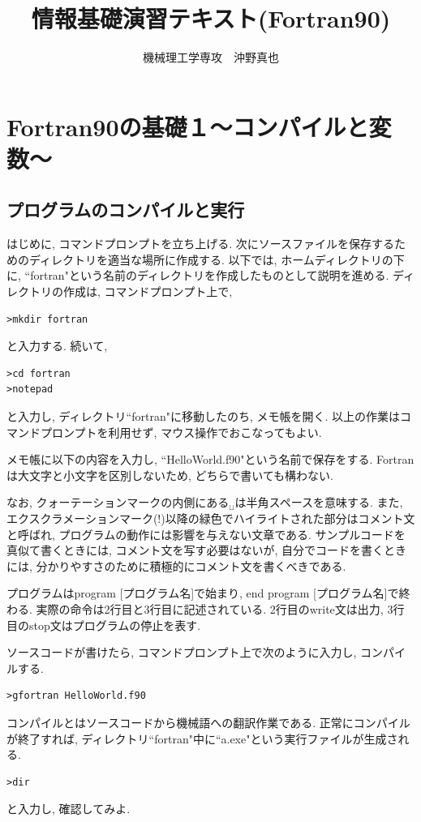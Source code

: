 \documentclass[a4j]{jsbook}
\begin{document}
\title{情報基礎演習テキスト(Fortran90)}
\author{機械理工学専攻　沖野真也}
\date{}
\maketitle

\chapter{Fortran90の基礎１〜コンパイルと変数〜}

\section{プログラムのコンパイルと実行}
はじめに, コマンドプロンプトを立ち上げる.
次にソースファイルを保存するためのディレクトリを適当な場所に作成する.
以下では, ホームディレクトリの下に, ``fortran"という名前のディレクトリを作成したものとして説明を進める.
ディレクトリの作成は, コマンドプロンプト上で,
\begin{Verbatim}[frame=single]
>mkdir fortran
\end{Verbatim}
と入力する. 続いて,
\begin{Verbatim}[frame=single]
>cd fortran
>notepad
\end{Verbatim}
と入力し, ディレクトリ``fortran"に移動したのち, メモ帳を開く.
以上の作業はコマンドプロンプトを利用せず, マウス操作でおこなってもよい.

メモ帳に以下の内容を入力し, ``HelloWorld.f90"という名前で保存をする.
Fortranは大文字と小文字を区別しないため, どちらで書いても構わない.

なお, クォーテーションマークの内側にある$_{\sqcup}$は半角スペースを意味する.
また, エクスクラメーションマーク(!)以降の緑色でハイライトされた部分はコメント文と呼ばれ,
プログラムの動作には影響を与えない文章である.
サンプルコードを真似て書くときには, コメント文を写す必要はないが,
自分でコードを書くときには, 分かりやすさのために積極的にコメント文を書くべきである.

プログラムはprogram [プログラム名]で始まり, end program [プログラム名]で終わる.
実際の命令は2行目と3行目に記述されている.
2行目のwrite文は出力, 3行目のstop文はプログラムの停止を表す.


ソースコードが書けたら, コマンドプロンプト上で次のように入力し, コンパイルする.
\begin{Verbatim}[frame=single]
>gfortran HelloWorld.f90
\end{Verbatim}
コンパイルとはソースコードから機械語への翻訳作業である.
正常にコンパイルが終了すれば, ディレクトリ``fortran"中に``a.exe"という実行ファイルが生成される.
\begin{Verbatim}[frame=single]
>dir
\end{Verbatim}
と入力し, 確認してみよ.
\end{document}
